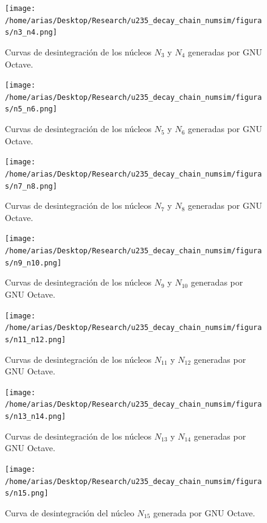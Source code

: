 \begin{figure}[H]
	\centering
	\texttt{[image: /home/arias/Desktop/Research/u235\_decay\_chain\_numsim/figuras/n3\_n4.png]}\label{n3n4}\caption{Curvas de desintegración de los núcleos $N_3$ y $N_4$ generadas por GNU Octave.}
\end{figure}

\begin{figure}[H]
	\centering
	\texttt{[image: /home/arias/Desktop/Research/u235\_decay\_chain\_numsim/figuras/n5\_n6.png]}\label{n5n6}\caption{Curvas de desintegración de los núcleos $N_5$ y $N_6$ generadas por GNU Octave.}
\end{figure}

\begin{figure}[H]
	\centering
	\texttt{[image: /home/arias/Desktop/Research/u235\_decay\_chain\_numsim/figuras/n7\_n8.png]}\label{n7n8}\caption{Curvas de desintegración de los núcleos $N_7$ y $N_8$ generadas por GNU Octave.}
\end{figure}

\begin{figure}[H]
	\centering
	\texttt{[image: /home/arias/Desktop/Research/u235\_decay\_chain\_numsim/figuras/n9\_n10.png]}\label{n9n10}\caption{Curvas de desintegración de los núcleos $N_9$ y $N_{10}$ generadas por GNU Octave.}
\end{figure}

\begin{figure}[H]
	\centering
	\texttt{[image: /home/arias/Desktop/Research/u235\_decay\_chain\_numsim/figuras/n11\_n12.png]}\label{n11n12}\caption{Curvas de desintegración de los núcleos $N_{11}$ y $N_{12}$ generadas por GNU Octave.}
\end{figure}

\begin{figure}[H]
	\centering
	\texttt{[image: /home/arias/Desktop/Research/u235\_decay\_chain\_numsim/figuras/n13\_n14.png]}\label{n13n14}\caption{Curvas de desintegración de los núcleos $N_{13}$ y $N_{14}$ generadas por GNU Octave.}
\end{figure}

\begin{figure}[H]
	\centering
	\texttt{[image: /home/arias/Desktop/Research/u235\_decay\_chain\_numsim/figuras/n15.png]}\label{n15}\caption{Curva de desintegración del núcleo $N_{15}$ generada por GNU Octave.}
\end{figure}